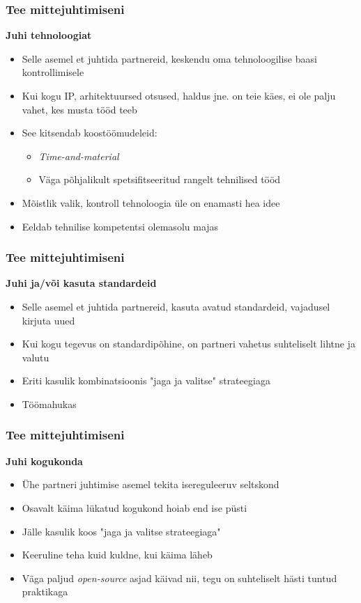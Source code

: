 \begin{frame}[fragile]
  \frametitle{Tee mittejuhtimiseni}
		\textbf{Juhi tehnoloogiat}
	\begin{itemize}
		\item Selle asemel et juhtida partnereid, keskendu oma tehnoloogilise baasi kontrollimisele
		\item Kui kogu IP, arhitektuursed otsused, haldus jne. on teie käes, ei ole palju vahet, kes musta tööd teeb
		\item See kitsendab koostöömudeleid:
		\begin{itemize}
			\item \emph{Time-and-material}
			\item Väga põhjalikult spetsifitseeritud rangelt tehnilised tööd
		\end{itemize}
		\item Mõistlik valik, kontroll tehnoloogia üle on enamasti hea idee
		\item Eeldab tehnilise kompetentsi olemasolu majas
	\end{itemize}
\end{frame}

\begin{frame}[fragile]
  \frametitle{Tee mittejuhtimiseni}
		\textbf{Juhi ja/või kasuta standardeid}
	\begin{itemize}
		\item Selle asemel et juhtida partnereid, kasuta avatud standardeid, vajadusel kirjuta uued
		\item Kui kogu tegevus on standardipõhine, on partneri vahetus suhteliselt lihtne ja valutu
		\item Eriti kasulik kombinatsioonis "jaga ja valitse" strateegiaga
		\item Töömahukas
	\end{itemize}
\end{frame}

\begin{frame}[fragile]
  \frametitle{Tee mittejuhtimiseni}
	\textbf{Juhi kogukonda}
	\begin{itemize}
		\item Ühe partneri juhtimise asemel tekita isereguleeruv seltskond 
		\item Osavalt käima lükatud kogukond hoiab end ise püsti
		\item Jälle kasulik koos "jaga ja valitse strateegiaga"
		\item Keeruline teha kuid kuldne, kui käima läheb
		\item Väga paljud \emph{open-source} asjad käivad nii, tegu on suhteliselt hästi tuntud praktikaga
	\end{itemize}
\end{frame}

